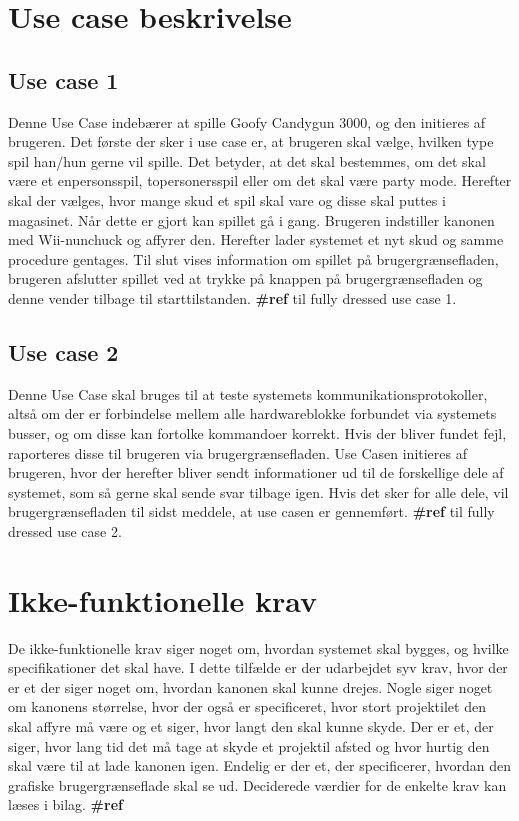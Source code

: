 \newpage
\section{Use case beskrivelse}
\subsection{Use case 1}
Denne Use Case indebærer at spille Goofy Candygun 3000, og den initieres af brugeren. Det første der sker i use case er, at brugeren skal vælge, hvilken type spil han/hun gerne vil spille. Det betyder, at det skal bestemmes, om det skal være et enpersonsspil, topersonersspil eller om det skal være party mode. Herefter skal der vælges, hvor mange skud et spil skal vare og disse skal puttes i magasinet. Når dette er gjort kan spillet gå i gang. Brugeren indstiller kanonen med Wii-nunchuck og affyrer den. Herefter lader systemet et nyt skud og samme procedure gentages. Til slut vises information om spillet på brugergrænsefladen, brugeren afslutter spillet ved at trykke på knappen på brugergrænsefladen og denne vender tilbage til starttilstanden. \textbf{\#ref} til fully dressed use case 1.

\subsection{Use case 2}
Denne Use Case skal bruges til at teste systemets kommunikationsprotokoller, altså om der er forbindelse mellem alle hardwareblokke forbundet via systemets busser, og om disse kan fortolke kommandoer korrekt. Hvis der bliver fundet fejl, raporteres disse til brugeren via brugergrænsefladen. Use Casen initieres af brugeren, hvor der herefter bliver sendt informationer ud til de forskellige dele af systemet, som så gerne skal sende svar tilbage igen. Hvis det sker for alle dele, vil brugergrænsefladen til sidst meddele, at use casen er gennemført. \textbf{\#ref} til fully dressed use case 2.


\section{Ikke-funktionelle krav}
De ikke-funktionelle krav siger noget om, hvordan systemet skal bygges, og hvilke specifikationer det skal have. I dette tilfælde er der udarbejdet syv krav, hvor der er et der siger noget om, hvordan kanonen skal kunne drejes. Nogle siger noget om kanonens størrelse, hvor der også er specificeret, hvor stort projektilet den skal affyre må være og et siger, hvor langt den skal kunne skyde. Der er et, der siger, hvor lang tid det må tage at skyde et projektil afsted og hvor hurtig den skal være til at lade kanonen igen. Endelig er der et, der specificerer, hvordan den grafiske brugergrænseflade skal se ud. Deciderede værdier for de enkelte krav kan læses i bilag. \textbf{\#ref}







